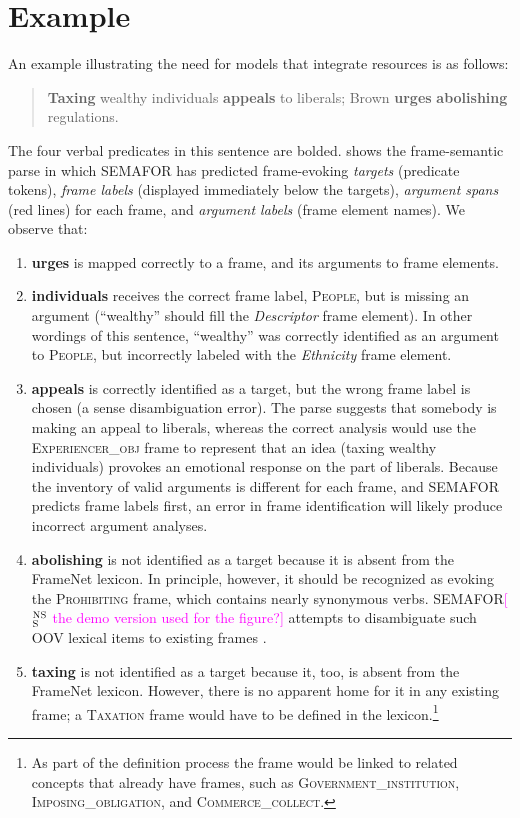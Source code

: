 \documentclass[11pt]{article}
\newcommand{\ensuretext}[1]{#1}
\newcommand{\nssmarker}{\ensuretext{\textcolor{magenta}{\ensuremath{^{\textsc{NS}}_{\textsc{S}}}}}}
\newcommand{\arkcomment}[3]{\ensuretext{\textcolor{#3}{[#1 #2]}}}
\newcommand{\nss}[1]{\arkcomment{\nssmarker}{#1}{magenta}}
\newcommand{\vpred}[1]{\textbf{#1}} %
\newcommand{\fname}[1]{\textsc{#1}} %
\newcommand{\rname}[1]{\textsl{#1}} %
\begin{document}
\section{Example}\label{sec:example}

An example illustrating the need for models that integrate resources is as follows:
\begin{quote}
\vpred{Taxing} wealthy individuals \vpred{appeals} to liberals; Brown \vpred{urges} \vpred{abolishing} regulations.
\end{quote}
The four verbal predicates in this sentence are bolded. %
 shows the frame-semantic parse in which SEMAFOR 
has predicted frame-evoking \emph{targets} (predicate tokens), 
\emph{frame labels} (displayed immediately below the targets), 
\emph{argument spans} (red lines) for each frame, and 
\emph{argument labels} (frame element names).
We observe that:
\begin{enumerate}
  \item \vpred{urges} is mapped correctly to a frame, and its arguments to frame elements.
  \item \vpred{individuals} receives the correct frame label, \fname{People}, but is missing an argument 
  (``wealthy'' should fill the \rname{Descriptor} frame element). In other wordings of this sentence, 
  ``wealthy'' was correctly identified as an argument to \fname{People}, but incorrectly labeled 
  with the \rname{Ethnicity} frame element. 
  \item \vpred{appeals} is correctly identified as a target, but the wrong frame label is chosen 
  (a sense disambiguation error). The parse suggests that somebody is making an appeal to liberals, 
  whereas the correct analysis would use the \fname{Experiencer\_obj} frame to represent that an idea
  (taxing wealthy individuals) provokes an emotional response on the part of liberals. 
  Because the inventory of valid arguments is different for each frame, and SEMAFOR predicts frame labels first, 
  an error in frame identification will likely produce incorrect argument analyses.
  \item \vpred{abolishing} is not identified as a target because it is absent from the FrameNet lexicon. 
  In principle, however, it should be recognized as evoking the \fname{Prohibiting} frame, which contains 
  nearly synonymous verbs. SEMAFOR\nss{the demo version used for the figure?} attempts to disambiguate such OOV lexical items 
  to existing frames \citep{das-acl2011}.
  \item \vpred{taxing} is not identified as a target because it, too, is absent from the FrameNet lexicon. 
  However, there is no apparent home for it in any existing frame; a \fname{Taxation} frame would have to be defined 
  in the lexicon.\footnote{As part of the definition process the frame would be linked to related concepts that already have frames, 
  such as \fname{Government\_institution}, \fname{Imposing\_obligation}, and \fname{Commerce\_collect}.}
\end{enumerate}
\end{document}

